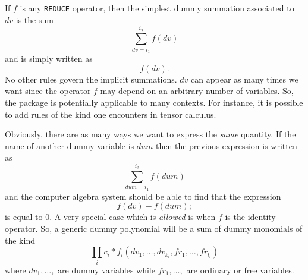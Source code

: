 If $f$ is any {\tt REDUCE} operator, then the simplest dummy summation 
associated to $dv$ is the sum
\[
\sum_{dv=i_1}^{i_2} f(dv)
\]
and is simply written as
\[
f(dv). 
\]
No other rules govern the implicit summations. $dv$ can appear as many times
we want since the operator $f$ may depend on an arbitrary number of 
variables. So, the package is potentially applicable to many contexts.
For instance, it is possible to add rules of the kind one encounters in 
tensor calculus.      

Obviously, there are as many ways we want to express the {\em same} quantity.
If the name of another dummy variable is $dum$ then 
the previous expression is written as
\[
\sum_{dum=i_1}^{i_2} f(dum)
\]
and the computer algebra system should be able to find that the expression
\[
f(dv)-f(dum);
\]
is equal to $0$.
A very special case which is {\em allowed} is when $f$ is the identity 
operator.
So, a generic dummy polynomial will be a sum 
of dummy monomials of the  kind
\[
\prod_i c_i*f_i(dv_1,\ldots ,dv_{k_i},fr_1,\ldots , fr_{l_i})
\]
where $dv_1,\ldots,$ are dummy variables while $fr_1, \ldots, $ 
are ordinary or free variables. 

